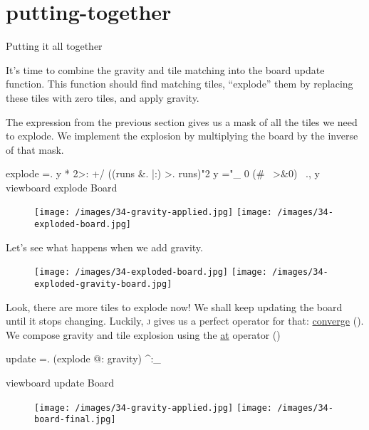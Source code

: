 \documentclass{article}
\begin{document}
\section{putting-together}{Putting it all together}

It's time to combine the gravity and tile matching into the board update function.
This function should find matching tiles, ``explode'' them by replacing these tiles with zero tiles, and apply gravity.

The expression from the previous section gives us a mask of all the tiles we need to explode.
We implement the explosion by multiplying the board by the inverse of that mask.

\begin{code}[j]
   explode =. {{ y * 2>: +/ ((runs &. |:) >. runs)"2 y ="_ 0 (#~ >&0) ~., y }}
   viewboard explode Board
\end{code}

\begin{figure}
\texttt{[image: /images/34-gravity-applied.jpg]}
\texttt{[image: /images/34-exploded-board.jpg]}
\end{figure}

Let's see what happens when we add gravity.
\begin{figure}
\texttt{[image: /images/34-exploded-board.jpg]}
\texttt{[image: /images/34-exploded-gravity-board.jpg]}
\end{figure}

Look, there are more tiles to explode now!
We shall keep updating the board until it stops changing.
Luckily, \textsc{j} gives us a perfect operator for that: \href{https://code.jsoftware.com/wiki/Vocabulary/hatco#u.5E:_.28Converge.29}{converge} (\code{^:_}). We compose gravity and tile explosion using the \href{https://code.jsoftware.com/wiki/Vocabulary/atco}{at} operator ()

\begin{code}[j]
   update =. (explode @: gravity) ^:_

   viewboard update Board
\end{code}

\begin{figure}
\texttt{[image: /images/34-gravity-applied.jpg]}
\texttt{[image: /images/34-board-final.jpg]}
\end{figure}
\end{document}
